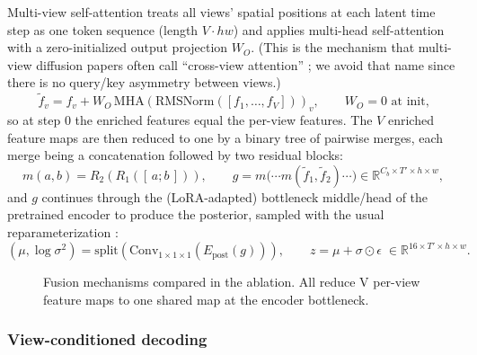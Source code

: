 Multi-view self-attention treats all views' spatial positions at each latent time step as one token sequence (length $V \cdot hw$) and applies multi-head self-attention with a zero-initialized output projection $W_O$. (This is the mechanism that multi-view diffusion papers often call ``cross-view attention'' \cite{shi2023mvdream, gao2024cat3d}; we avoid that name since there is no query/key asymmetry between views.)
\begin{equation}
\tilde{f}_v = f_v + W_O \,\mathrm{MHA}\!\left(\mathrm{RMSNorm}([f_1, \dots, f_V])\right)_v ,
\qquad W_O = 0 \text{ at init,}
\label{eq:fusion_attn}
\end{equation}
so at step 0 the enriched features equal the per-view features. The $V$ enriched feature maps are then reduced to one by a binary tree of pairwise merges, each merge being a concatenation followed by two residual blocks:
\begin{equation}
m(a, b) = R_2\!\left(R_1\!\left([\,a ; b\,]\right)\right),
\qquad
g = m\big(\cdots m(\tilde{f}_1, \tilde{f}_2) \cdots\big) \in \mathbb{R}^{C_b \times T' \times h \times w},
\label{eq:tree_merge}
\end{equation}
and $g$ continues through the (LoRA-adapted) bottleneck middle/head of the pretrained encoder to produce the posterior, sampled with the usual reparameterization \cite{kingma2013auto}:
\begin{equation}
(\mu, \log \sigma^2) = \mathrm{split}\!\left(\mathrm{Conv}_{1\times1\times1}\!\left(E_{\mathrm{post}}(g)\right)\right),
\qquad
z = \mu + \sigma \odot \epsilon \;\in \mathbb{R}^{16 \times T' \times h \times w}.
\end{equation}

\begin{figure}[t]
\centering
{}
\caption{Fusion mechanisms compared in the ablation. All reduce V per-view feature maps to one shared map at the encoder bottleneck.}
\label{fig:fusion}
\end{figure}

\subsubsection{View-conditioned decoding}

